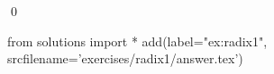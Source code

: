 
\begin{ex} 
  \label{ex:radix1}
  
  \qed
\end{ex} 
\begin{python0}
from solutions import *
add(label="ex:radix1",
    srcfilename='exercises/radix1/answer.tex') 
\end{python0}
